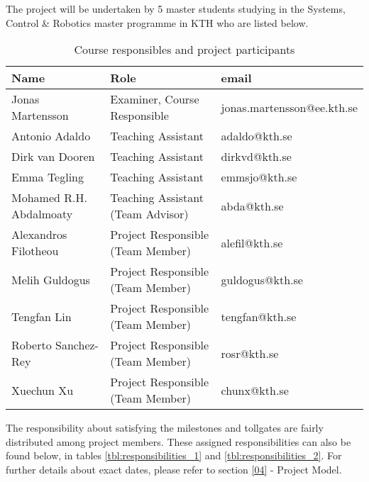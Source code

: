 The project will be undertaken by 5 master students studying in the Systems,
Control \& Robotics master programme in KTH who are listed below.

\begin{table}[H]
    \begin{tabular}{l|l|l}
    Name                             & Role                                  & email                      \\ \hline
    Jonas Martensson                 & Examiner, Course Responsible          & jonas.martensson@ee.kth.se \\ \hline
    Antonio Adaldo                   & Teaching Assistant                    & adaldo@kth.se              \\
    Dirk van Dooren                  & Teaching Assistant                    & dirkvd@kth.se              \\
    Emma Tegling                     & Teaching Assistant                    & emmsjo@kth.se              \\ \hline
    Mohamed R.H. Abdalmoaty          & Teaching Assistant (Team Advisor)     & abda@kth.se                \\ \hline
    Alexandros Filotheou             & Project Responsible (Team Member)     & alefil@kth.se              \\
    Melih Guldogus                   & Project Responsible (Team Member)     & guldogus@kth.se            \\
    Tengfan Lin                      & Project Responsible (Team Member)     & tengfan@kth.se             \\
    Roberto Sanchez-Rey              & Project Responsible (Team Member)     & rosr@kth.se                \\
    Xuechun Xu                       & Project Responsible (Team Member)     & chunx@kth.se               \\
    \end{tabular}
    \caption{Course responsibles and project participants}
\end{table}

The responsibility about satisfying the milestones and tollgates are fairly
distributed among project members. These assigned responsibilities can also be
found below, in tables \ref{tbl:responsibilities_1} and
\ref{tbl:responsibilities_2}. For further details about exact dates, please
refer to section \ref{04} - Project Model.


